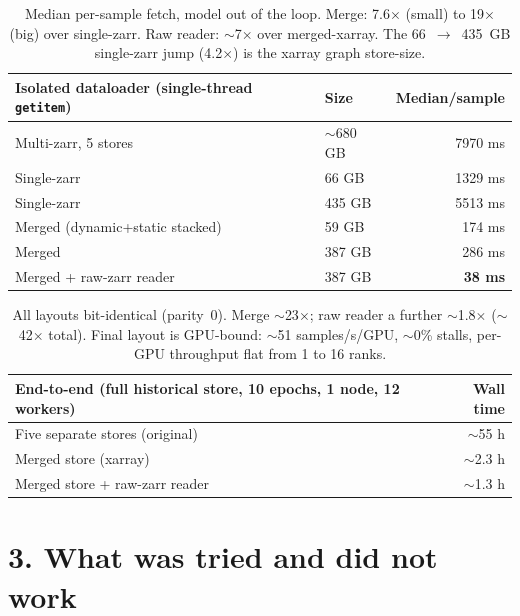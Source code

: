 \documentclass[11pt,a4paper]{article}
\newcommand{\x}{$\times$}
\newcommand{\ra}{$\to$}
\begin{document}
\begin{table}[ht]
\centering\small
\begin{tabular}{@{}llr@{}}
\toprule
\textbf{Isolated dataloader (single-thread \texttt{getitem})} & \textbf{Size} & \textbf{Median/sample} \\
\midrule
Multi-zarr, 5 stores          & $\sim$680 GB & 7970 ms \\
Single-zarr                   & 66 GB        & 1329 ms \\
Single-zarr                   & 435 GB       & 5513 ms \\
Merged (dynamic+static stacked) & 59 GB      &  174 ms \\
Merged                        & 387 GB       &  286 ms \\
Merged + raw-zarr reader      & 387 GB       & \textbf{38 ms} \\
\bottomrule
\end{tabular}
\caption{Median per-sample fetch, model out of the loop. Merge: 7.6\x{} (small) to 19\x{} (big) over
single-zarr. Raw reader: $\sim$7\x{} over merged-xarray. The 66~\ra{}~435~GB single-zarr jump (4.2\x)
is the xarray graph store-size.}
\end{table}

\begin{table}[ht]
\centering\small
\begin{tabular}{@{}lr@{}}
\toprule
\textbf{End-to-end (full historical store, 10 epochs, 1 node, 12 workers)} & \textbf{Wall time} \\
\midrule
Five separate stores (original)   & $\sim$55 h \\
Merged store (xarray)             & $\sim$2.3 h \\
Merged store + raw-zarr reader    & $\sim$1.3 h \\
\bottomrule
\end{tabular}
\caption{All layouts bit-identical (parity~0). Merge $\sim$23\x; raw reader a further $\sim$1.8\x{}
($\sim$42\x{} total). Final layout is GPU-bound: $\sim$51 samples/s/GPU, $\sim$0\% stalls, per-GPU
throughput flat from 1 to 16 ranks.}
\end{table}
\newpage
\section*{3. What was tried and did not work}
\end{document}
